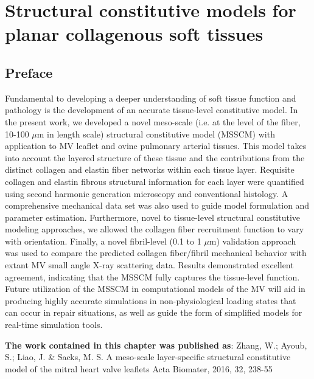 \chapter{Structural constitutive models for planar collagenous soft tissues}


\section*{Preface}
%

    Fundamental to developing a deeper understanding of soft tissue function and pathology is the development of an accurate tissue-level constitutive model. In the present work, we developed a novel meso-scale (i.e. at the level of the fiber, 10-100 $\mu$m in length scale) structural constitutive model (MSSCM) with application to MV leaflet and ovine pulmonary arterial tissues. This model takes into account the layered structure of these tissue and the contributions from the distinct collagen and elastin fiber networks within each tissue layer. Requisite collagen and elastin fibrous structural information for each layer were quantified using second harmonic generation microscopy and conventional histology. A comprehensive mechanical data set was also used to guide model formulation and parameter estimation. Furthermore, novel to tissue-level structural constitutive modeling approaches, we allowed the collagen fiber recruitment function to vary with orientation. Finally, a novel fibril-level (0.1 to 1 $\mu$m) validation approach was used to compare the predicted collagen fiber/fibril mechanical behavior with extant MV small angle X-ray scattering data. Results demonstrated excellent agreement, indicating that the MSSCM fully captures the tissue-level function. Future utilization of the MSSCM in computational models of the MV will aid in producing highly accurate simulations in non-physiological loading states that can occur in repair situations, as well as guide the form of simplified models for real-time simulation tools.

\textbf{The work contained in this chapter was published as}:  Zhang, W.; Ayoub, S.; Liao, J. \& Sacks, M. S.
A meso-scale layer-specific structural constitutive model of the mitral heart valve leaflets 
Acta Biomater, 2016, 32, 238-55 





















